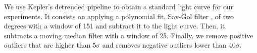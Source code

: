 

We use Kepler's detrended pipeline \citep{fanelli2011kepler} to obtain a standard light curve for our experiments.%
It consists on applying a polynomial fit, Sav-Gol filter \citep{savitzky1964smoothing}, of two degrees with a window of 151 and subtract it to the light curve. Then, it subtracts a moving median filter with a window of 25. Finally, we remove positive outliers that are higher than $5\sigma$ and removes negative outliers lower than $40 \sigma$. 


